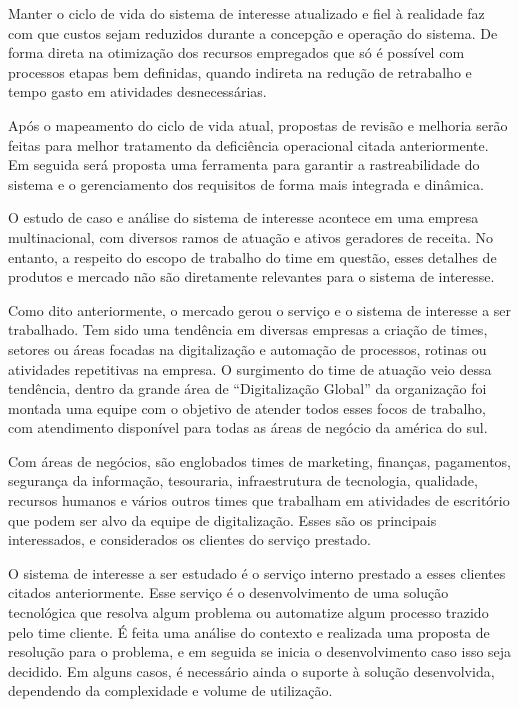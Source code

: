 	Manter o ciclo de vida do sistema de interesse atualizado e fiel à realidade faz com 
	que custos sejam reduzidos durante a concepção e operação do sistema. De forma 
	direta na otimização dos recursos empregados que só é possível com processos
	etapas bem definidas, quando indireta na redução de retrabalho e tempo gasto em 
	atividades desnecessárias.  

	Após o mapeamento do ciclo de vida atual, propostas de revisão e melhoria serão 
	feitas para melhor tratamento da deficiência operacional citada anteriormente. Em 
	seguida será proposta uma ferramenta para garantir a rastreabilidade do sistema 
	e o gerenciamento dos requisitos de forma mais integrada e dinâmica. 

	O estudo de caso e análise do sistema de interesse acontece em uma empresa 
	multinacional, com diversos ramos de atuação e ativos geradores de receita. No 
	entanto, a respeito do escopo de trabalho do time em questão, esses detalhes de 
	produtos e mercado não são diretamente relevantes para o sistema de interesse. 

	Como dito anteriormente, o mercado gerou o serviço e o sistema de interesse a 
	ser trabalhado. Tem sido uma tendência em diversas empresas a criação de times, 
	setores ou áreas focadas na digitalização e automação de processos, rotinas ou 
	atividades repetitivas na empresa. O surgimento do time de atuação veio dessa 
	tendência, dentro da grande área de “Digitalização Global” da organização foi 
	montada uma equipe com o objetivo de atender todos esses focos de trabalho, com 
	atendimento disponível para todas as áreas de negócio da américa do sul. 

	Com áreas de negócios, são englobados times de marketing, finanças, 
	pagamentos, segurança da informação, tesouraria, infraestrutura de tecnologia, 
	qualidade, recursos humanos e vários outros times que trabalham em atividades 
	de escritório que podem ser alvo da equipe de digitalização. Esses são os principais 
	interessados, e considerados os clientes do serviço prestado. 

	O sistema de interesse a ser estudado é o serviço interno prestado a esses clientes 
	citados anteriormente. Esse serviço é o desenvolvimento de uma solução 
	tecnológica que resolva algum problema ou automatize algum processo trazido pelo 
	time cliente. É feita uma análise do contexto e realizada uma proposta de resolução 
	para o problema, e em seguida se inicia o desenvolvimento caso isso seja decidido. 
	Em alguns casos, é necessário ainda o suporte à solução desenvolvida, dependendo 
	da complexidade e volume de utilização. 

